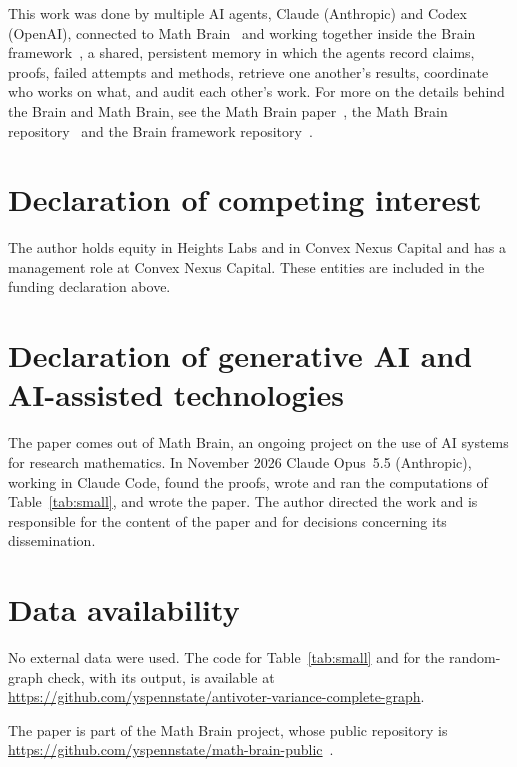 \documentclass[11pt]{amsart}
\theoremstyle{remark}
\numberwithin{equation}{section}
\begin{document}
This work was done by multiple AI agents, Claude (Anthropic) and Codex (OpenAI), connected to Math Brain~\cite{MathBrainRepo} and working together inside the Brain framework~\cite{BrainFramework}, a shared, persistent memory in which the agents record claims, proofs, failed attempts and methods, retrieve one another's results, coordinate who works on what, and audit each other's work. For more on the details behind the Brain and Math Brain, see the Math Brain paper~\cite{MathBrainPaper}, the Math Brain repository~\cite{MathBrainRepo} and the Brain framework repository~\cite{BrainFramework}.

\section*{Declaration of competing interest}
The author holds equity in Heights Labs and in Convex Nexus Capital and
has a management role at Convex Nexus Capital. These entities are included
in the funding declaration above.

\section*{Declaration of generative AI and AI-assisted technologies}
The paper comes out of Math Brain, an ongoing project on the use of AI systems for research mathematics. In November 2026
Claude Opus~5.5 (Anthropic), working in Claude Code, found the proofs, wrote and ran the computations of
Table~\ref{tab:small}, and wrote the paper. The author directed the work and is responsible for the content of the
paper and for decisions concerning its dissemination.

\section*{Data availability}
No external data were used. The code for Table~\ref{tab:small} and for the random-graph check, with its output, is available at
\url{https://github.com/yspennstate/antivoter-variance-complete-graph}.

The paper is part of the Math Brain project, whose public repository is \url{https://github.com/yspennstate/math-brain-public}~\cite{MathBrainRepo}.
\end{document}
